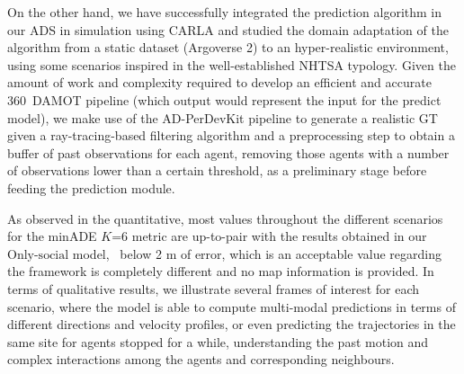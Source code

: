 On the other hand, we have successfully integrated the prediction algorithm in our \ac{ADS} in simulation using \ac{CARLA} and studied the domain adaptation of the algorithm from a static dataset (Argoverse 2) to an hyper-realistic environment, using some scenarios inspired in the well-established \ac{NHTSA} typology. Given the amount of work and complexity required to develop an efficient and accurate 360\degree~\ac{DAMOT} pipeline (which output would represent the input for the predict model), we make use of the \ac{AD-PerDevKit} pipeline to generate a realistic \ac{GT} given a ray-tracing-based filtering algorithm and a preprocessing step to obtain a buffer of past observations for each agent, removing those agents with a number of observations lower than a certain threshold, as a preliminary stage before feeding the prediction module. 

As observed in the quantitative, most values throughout the different scenarios for the \ac{minADE} $K$=6 metric are up-to-pair with the results obtained in our $\text{Only-social}$ model, \ie \ below 2 m of error, which is an acceptable value regarding the framework is completely different and no map information is provided. In terms of qualitative results, we illustrate several frames of interest for each scenario, where the model is able to compute multi-modal predictions in terms of different directions and velocity profiles, or even predicting the trajectories in the same site for agents stopped for a while, understanding the past motion and complex interactions among the agents and corresponding neighbours. 


